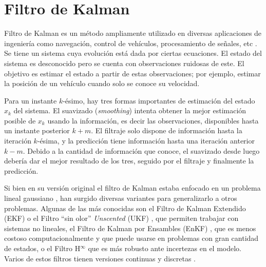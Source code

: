 \section{Filtro de Kalman}\label{sec:kalman}


Filtro de Kalman es un método ampliamente utilizado en diversas aplicaciones de ingeniería como navegación, control de vehículos, procesamiento de señales, etc \cite{Auger2013}. Se tiene un sistema cuya evolución está dada por ciertas ecuaciones. El estado del sistema es desconocido pero se cuenta con observaciones ruidosas de este. El objetivo es estimar el estado a partir de estas observaciones; por ejemplo, estimar la posición de un vehículo cuando solo se conoce su velocidad.

Para un instante \(k\)-ésimo, hay tres formas importantes de estimación del estado \(x_k\) del sistema. El suavizado (\emph{smoothing}) intenta obtener la mejor estimación posible de \(x_k\) usando la información, es decir las observaciones, disponibles hasta un instante posterior \(k+m\). El filtraje solo dispone de información hasta la iteración \(k\)-ésima, y la predicción tiene información hasta una iteración anterior \(k-m\). Debido a la cantidad de información que conoce, el suavizado desde luego debería dar el mejor resultado de los tres, seguido por el filtraje y finalmente la predicción. 

Si bien en su versión original el filtro de Kalman estaba enfocado en un problema lineal gaussiano \cite{Kalman1960}, han surgido diversas variantes para generalizarlo a otros problemas. Algunas de las más conocidas son el Filtro de Kalman Extendido (EKF) o el Filtro ``sin olor'' \textit{Unscented} (UKF) \cite{Cai2006}, que permiten trabajar con sistemas no lineales, el Filtro de Kalman por Ensambles (EnKF) \cite{Katzfuss2016}, que es menos costoso computacionalmente y que puede usarse en problemas con gran cantidad de estados, o el Filtro H\(^\infty\) que es más robusto ante incertezas en el modelo. Varios de estos filtros tienen versiones continuas y discretas \cite{Kulikov2014}.

